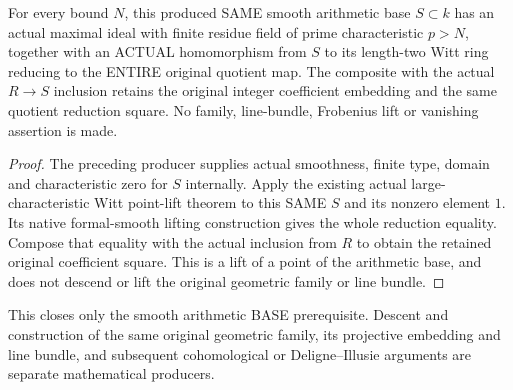 \begin{corollary}
\label{cor:arithmetic-produced-smooth-base-witt-point}
\leanok
{}
For every bound $N$, this produced SAME smooth arithmetic base $S\subset k$
has an actual maximal ideal with finite residue field of prime
characteristic $p>N$, together with an ACTUAL homomorphism from $S$ to its
length-two Witt ring reducing to the ENTIRE original quotient map.
The composite with the actual $R\to S$ inclusion retains the original
integer coefficient embedding and the same quotient reduction square.
No family, line-bundle, Frobenius lift or vanishing assertion is made.
\end{corollary}
\begin{proof}
The preceding producer supplies actual smoothness, finite type, domain and
characteristic zero for $S$ internally. Apply the existing actual
large-characteristic Witt point-lift theorem to this SAME $S$ and its
nonzero element $1$. Its native formal-smooth lifting construction gives
the whole reduction equality. Compose that equality with the actual
inclusion from $R$ to obtain the retained original coefficient square.
This is a lift of a point of the arithmetic base, and does not descend or
lift the original geometric family or line bundle.
\end{proof}

This closes only the smooth arithmetic BASE prerequisite. Descent and
construction of the same original geometric family, its projective
embedding and line bundle, and subsequent cohomological or Deligne--Illusie
arguments are separate mathematical producers.
